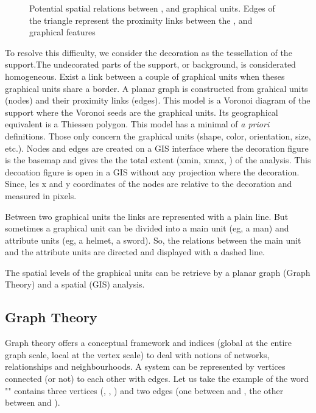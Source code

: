 \documentclass[article]{jss}
\begin{document}
\begin{figure}[H]
\centering
{}
\caption{Potential spatial relations between ,  and  graphical units. Edges of the triangle represent the proximity links between the ,  and  graphical features} \label{fig:triangle}
\end{figure}

To resolve this difficulty, we consider the decoration as the tessellation of the support.The undecorated parts of the support, or background, is considerated homogeneous. Exist a link between a couple of graphical units when theses graphical units share a border. A planar graph is constructed from grahical units (nodes) and their proximity links (edges). This model is a Voronoi diagram of the support where the Voronoi seeds are the graphical units. Its geographical equivalent is a Thiessen polygon. This model has a minimal of \emph{a priori} definitions. Those only concern the graphical units (shape, color, orientation, size, etc.). 
Nodes and edges are created on a GIS interface where the decoration figure is the basemap and gives the  the total extent (xmin, xmax, ) of the analysis. This decoation figure is open in a GIS without any projection where the decoration. Since, les x and y coordinates of the nodes are relative to the decoration and measured in pixels.

Between two graphical units the links are represented with a plain line. But sometimes a graphical unit can be divided into a main unit (eg, a man) and attribute units (eg, a helmet, a sword). So, the relations between the main unit and the attribute units are directed and displayed with a dashed line.

The spatial levels of the graphical units can be retrieve by a planar graph (Graph Theory) and a spatial (GIS) analysis.

\subsection{Graph Theory} \label{sec:graph_theory}

Graph theory offers a conceptual framework and indices (global at the entire graph scale, local at the vertex scale) to deal with notions of networks, relationships and neighbourhoods. A system can be represented by vertices connected (or not) to each other with edges. Let us take the example of the word "" contains three vertices (, , ) and two edges (one between  and , the other between  and ). 
\end{document}
